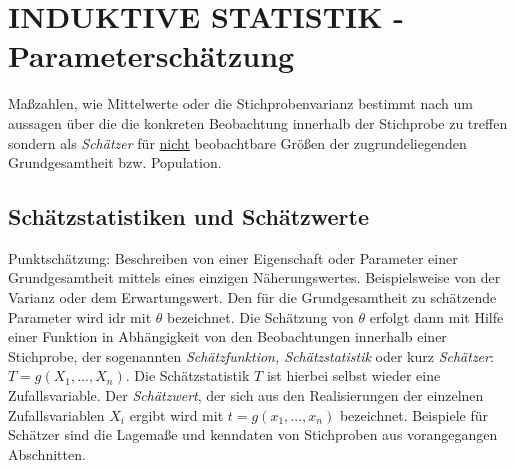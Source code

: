 \section{\textbf{INDUKTIVE STATISTIK} - Parameterschätzung}
Maßzahlen, wie Mittelwerte oder die Stichprobenvarianz bestimmt nach um aussagen über die die konkreten Beobachtung innerhalb der Stichprobe zu treffen sondern als \emph{Schätzer} für \underline{nicht} beobachtbare Größen der zugrundeliegenden Grundgesamtheit bzw. Population.
\subsection{Schätzstatistiken und Schätzwerte}
Punktschätzung: Beschreiben von einer Eigenschaft oder Parameter einer Grundgesamtheit mittels eines einzigen Näherungswertes. Beispielsweise von der Varianz oder dem Erwartungswert.
Den für die Grundgesamtheit zu schätzende Parameter wird idr mit $\theta$ bezeichnet. Die Schätzung von $\theta$ erfolgt dann mit Hilfe einer Funktion in Abhängigkeit von den Beobachtungen innerhalb einer Stichprobe, der sogenannten \emph{Schätzfunktion, Schätzstatistik} oder kurz \emph{Schätzer}: $T = g(X_1, ..., X_n)$. Die Schätzstatistik $T$ ist hierbei selbst wieder eine Zufallsvariable. Der \emph{Schätzwert}, der sich aus den Realisierungen der einzelnen Zufallsvariablen $X_i$ ergibt wird mit $t = g(x_1, ..., x_n)$ bezeichnet. Beispiele für Schätzer sind die Lagemaße und kenndaten von Stichproben aus vorangegangen Abschnitten.

